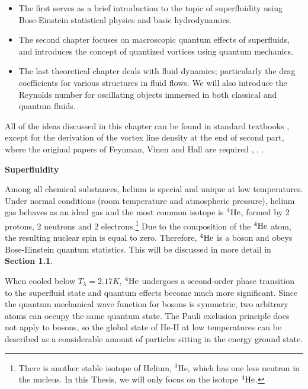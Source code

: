 \begin{itemize}
	\item[1.] The first serves as a brief introduction to the topic of superfluidity using  Bose-Einstein statistical physics and basic hydrodynamics.

	\item[2.] The second chapter focuses on macroscopic quantum effects of superfluids, and introduces the concept of quantized vortices using quantum mechanics.

	\item[3.] The last theoretical chapter deals with fluid dynamics; particularly the drag coefficients for various structures in fluid flows. We will also introduce the Reynolds number for oscillating objects immersed in both classical and quantum fluids.
\end{itemize}
All of the ideas discussed in this chapter can be found in standard textbooks \cite{skrbek}, \cite{landau} except for the derivation of the vortex line density at the end of second part, where the original papers of Feynman, Vinen and Hall are required \cite{feynman}, \cite{vinen1}, \cite{vinen2}.

\vspace{1cm}
{\Huge \bfseries Superfluidity}
\vspace{0.3cm}


Among all chemical substances, helium is special and unique at low temperatures. Under normal conditions (room temperature and atmospheric pressure), helium gas behaves as an ideal gas and the most common isotope is ${}^4\mathrm{He}$, formed by 2 protons, 2 neutrons and 2 electrons.\footnote{There is another stable isotope of Helium, ${}^3\mathrm{He}$, which has one less neutron in the nucleus. In this Thesis, we will only focus on the isotope ${}^4\mathrm{He}$.} Due to the composition of the ${}^4\mathrm{He}$ atom, the resulting nuclear spin is equal to zero. Therefore, ${}^4\mathrm{He}$  is a boson and obeys Bose-Einstein quantum statistics. This will be discussed in more detail in {\sffamily\textbf{Section 1.1}}.

When cooled below $ T_{\lambda}=2.17\unit{K} $, ${}^4\mathrm{He}$ undergoes a second-order phase transition to the superfluid state and quantum effects become much more significant. Since the quantum mechanical wave function for bosons is symmetric, two arbitrary atoms can occupy the same quantum state. The Pauli exclusion principle does not apply to bosons, so the global state of He-II at low temperatures can be described as a considerable amount of particles sitting in the energy ground state.

